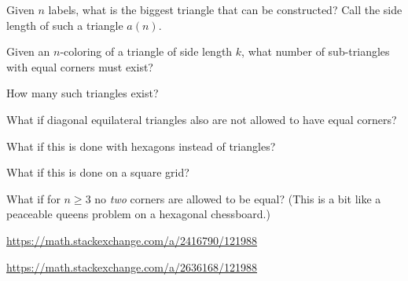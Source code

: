\documentclass{article}
\begin{document}
\begin{question}
  Given $n$ labels, what is the biggest triangle that can be constructed?
  Call the side length of such a triangle $a(n)$.
\end{question}
\begin{related}
  \item Given an $n$-coloring of a triangle of side length $k$, what number
    of sub-triangles with equal corners must exist?
  \item How many such triangles exist?
  \item What if diagonal equilateral triangles also are not allowed to have equal corners?
  \item What if this is done with hexagons instead of triangles?
  \item What if this is done on a square grid?
  \item What if for $n \geq 3$ no \textit{two} corners are allowed to be equal?
    (This is a bit like a peaceable queens problem on a hexagonal chessboard.)
\end{related}
\begin{references}
  \item \url{https://math.stackexchange.com/a/2416790/121988}
  \item \url{https://math.stackexchange.com/a/2636168/121988}
\end{references}
\end{document}
